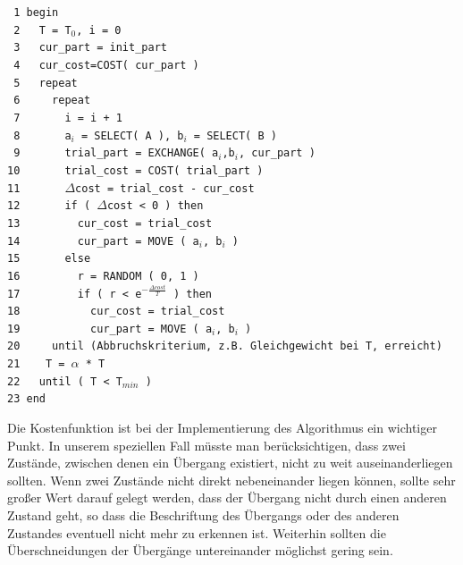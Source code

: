 \noindent
\verb| 1 begin|\\
\verb| 2   T = T|$_0$\verb|, i = 0|\\
\verb| 3   cur_part = init_part|\\
\verb| 4   cur_cost=COST( cur_part )|\\
\verb| 5   repeat|\\
\verb| 6     repeat|\\
\verb| 7       i = i + 1|\\
\verb| 8       a|$_i$\verb| = SELECT( A ), b|$_i$\verb| = SELECT( B )|\\
\verb| 9       trial_part = EXCHANGE( a|$_i$\verb|,b|$_i$\verb|, cur_part )|\\
\verb|10       trial_cost = COST( trial_part )|\\
\verb|11       |$\Delta$\verb|cost = trial_cost - cur_cost|\\
\verb|12       if ( |$\Delta$\verb|cost < 0 ) then|\\
\verb|13         cur_cost = trial_cost|\\
\verb|14         cur_part = MOVE ( a|$_i$\verb|, b|$_i$\verb| )|\\
\verb|15       else|\\
\verb|16         r = RANDOM ( 0, 1 )|\\
\verb|17         if ( r < e|$^{-\frac{\Delta cost}{T}}$\verb| ) then|\\
\verb|18           cur_cost = trial_cost|\\
\verb|19           cur_part = MOVE ( a|$_i$\verb|, b|$_i$\verb| )|\\
\verb|20     until (Abbruchskriterium, z.B. Gleichgewicht bei T, erreicht)|\\
\verb|21    T = |$\alpha$\verb| * T|\\
\verb|22   until ( T < T|$_{min}$\verb| )|\\
\verb|23 end|\\ 
\vspace{10pt}

Die Kostenfunktion ist bei der Implementierung des Algorithmus ein wichtiger
Punkt. In unserem speziellen Fall müsste man berücksichtigen, dass zwei
Zustände, zwischen denen ein Übergang existiert, nicht zu weit auseinanderliegen
sollten. Wenn zwei Zustände nicht direkt nebeneinander liegen können, sollte sehr
großer Wert darauf gelegt werden, dass der Übergang nicht durch einen anderen
Zustand geht, so dass die Beschriftung des Übergangs oder des anderen Zustandes
eventuell nicht mehr zu erkennen ist. Weiterhin sollten die Überschneidungen der
Übergänge untereinander möglichst gering sein.
\vspace{10pt}
